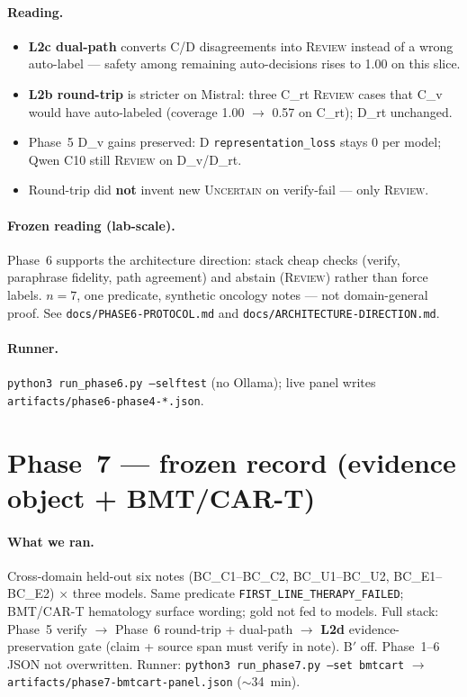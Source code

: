 \documentclass[11pt,a4paper]{article}
\newcommand{\pred}{\texttt{FIRST\_LINE\_THERAPY\_FAILED}}
\newcommand{\unc}{\textsc{Uncertain}}
\newcommand{\rev}{\textsc{Review}}
\begin{document}
\paragraph{Reading.}
\begin{itemize}
  \item \textbf{L2c dual-path} converts C/D disagreements into \rev{} instead of a wrong auto-label --- safety among remaining auto-decisions rises to 1.00 on this slice.
  \item \textbf{L2b round-trip} is stricter on Mistral: three C\_rt \rev{} cases that C\_v would have auto-labeled (coverage 1.00 $\rightarrow$ 0.57 on C\_rt); D\_rt unchanged.
  \item Phase~5 D\_v gains preserved: D \texttt{representation\_loss} stays 0 per model; Qwen C10 still \rev{} on D\_v/D\_rt.
  \item Round-trip did \textbf{not} invent new \unc{} on verify-fail --- only \rev{}.
\end{itemize}

\paragraph{Frozen reading (lab-scale).}
Phase~6 supports the architecture direction: stack cheap checks (verify, paraphrase fidelity, path agreement) and abstain (\rev) rather than force labels.
$n=7$, one predicate, synthetic oncology notes --- not domain-general proof.
See \texttt{docs/PHASE6-PROTOCOL.md} and \texttt{docs/ARCHITECTURE-DIRECTION.md}.

\paragraph{Runner.}
\texttt{python3 run\_phase6.py --selftest} (no Ollama); live panel writes \texttt{artifacts/phase6-phase4-*.json}.

\section{Phase~7 --- frozen record (evidence object + BMT/CAR-T)}

\paragraph{What we ran.}
Cross-domain held-out six notes (BC\_C1--BC\_C2, BC\_U1--BC\_U2, BC\_E1--BC\_E2) $\times$ three models.
Same predicate \pred; BMT/CAR-T hematology surface wording; gold not fed to models.
Full stack: Phase~5 verify $\rightarrow$ Phase~6 round-trip + dual-path $\rightarrow$ \textbf{L2d} evidence-preservation gate (claim + source span must verify in note).
B$'$ off. Phase~1--6 JSON not overwritten.
Runner: \texttt{python3 run\_phase7.py --set bmtcart} $\rightarrow$ \texttt{artifacts/phase7-bmtcart-panel.json} ($\sim$34~min).
\end{document}
